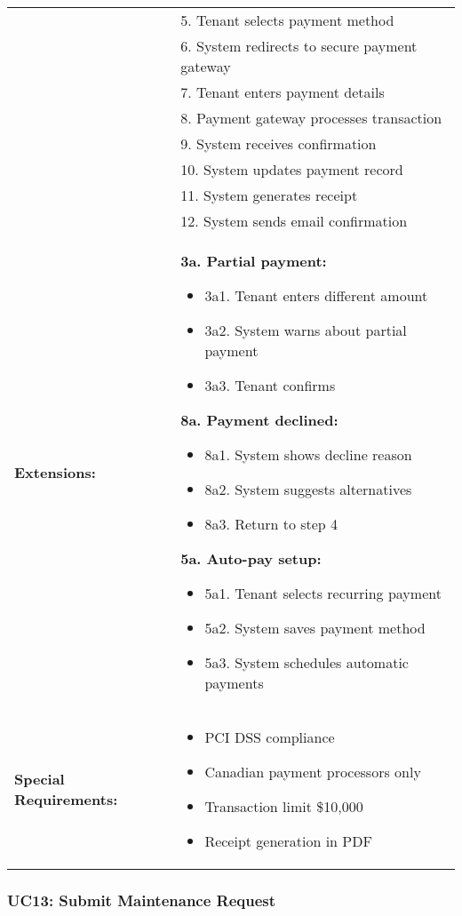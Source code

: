 \documentclass[12pt]{article}
\begin{document}
\begin{longtable}{|p{3cm}|p{11cm}|}
& 5. Tenant selects payment method \\
& 6. System redirects to secure payment gateway \\
& 7. Tenant enters payment details \\
& 8. Payment gateway processes transaction \\
& 9. System receives confirmation \\
& 10. System updates payment record \\
& 11. System generates receipt \\
& 12. System sends email confirmation \\
\hline
\textbf{Extensions:} & 
\textbf{3a. Partial payment:}
\begin{itemize}
    \item 3a1. Tenant enters different amount
    \item 3a2. System warns about partial payment
    \item 3a3. Tenant confirms
\end{itemize}
\textbf{8a. Payment declined:}
\begin{itemize}
    \item 8a1. System shows decline reason
    \item 8a2. System suggests alternatives
    \item 8a3. Return to step 4
\end{itemize}
\textbf{5a. Auto-pay setup:}
\begin{itemize}
    \item 5a1. Tenant selects recurring payment
    \item 5a2. System saves payment method
    \item 5a3. System schedules automatic payments
\end{itemize} \\
\hline
\textbf{Special Requirements:} & 
\begin{itemize}
    \item PCI DSS compliance
    \item Canadian payment processors only
    \item Transaction limit \$10,000
    \item Receipt generation in PDF
\end{itemize} \\
\hline
\end{longtable}

\subsubsection{UC13: Submit Maintenance Request}
\end{document}
